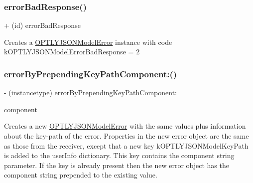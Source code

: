 \subsubsection{\texorpdfstring{error\+Bad\+Response()}{errorBadResponse()}}
{\footnotesize\ttfamily + (id) error\+Bad\+Response \begin{DoxyParamCaption}{ }\end{DoxyParamCaption}}

Creates a \mbox{\hyperlink{interface_o_p_t_l_y_j_s_o_n_model_error}{O\+P\+T\+L\+Y\+J\+S\+O\+N\+Model\+Error}} instance with code k\+O\+P\+T\+L\+Y\+J\+S\+O\+N\+Model\+Error\+Bad\+Response = 2 \mbox{\label{interface_o_p_t_l_y_j_s_o_n_model_error_aed94b5156c794349970df8a5eee57a9f}} 
\subsubsection{\texorpdfstring{error\+By\+Prepending\+Key\+Path\+Component\+:()}{errorByPrependingKeyPathComponent:()}}
{\footnotesize\ttfamily -\/ (instancetype) error\+By\+Prepending\+Key\+Path\+Component\+: \begin{DoxyParamCaption}\item[{(N\+S\+String $\ast$)}]{component }\end{DoxyParamCaption}}

Creates a new \mbox{\hyperlink{interface_o_p_t_l_y_j_s_o_n_model_error}{O\+P\+T\+L\+Y\+J\+S\+O\+N\+Model\+Error}} with the same values plus information about the key-\/path of the error. Properties in the new error object are the same as those from the receiver, except that a new key k\+O\+P\+T\+L\+Y\+J\+S\+O\+N\+Model\+Key\+Path is added to the user\+Info dictionary. This key contains the component string parameter. If the key is already present then the new error object has the component string prepended to the existing value. \mbox{\label{interface_o_p_t_l_y_j_s_o_n_model_error_ad58be197c439597044a3d160c3dfa400}} 

